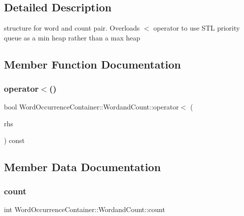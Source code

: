 \subsection{Detailed Description}
structure for word and count pair. Overloads $<$ operator to use S\+TL priority queue as a min heap rather than a max heap 

\subsection{Member Function Documentation}
\mbox{\label{struct_word_occurrence_container_1_1_wordand_count_a6922cc342d2df02f2786a5f1e676c7c0}} 
\subsubsection{\texorpdfstring{operator$<$()}{operator<()}}
{\footnotesize\ttfamily bool Word\+Occurrence\+Container\+::\+Wordand\+Count\+::operator$<$ (\begin{DoxyParamCaption}\item[{const \mbox{\hyperlink{struct_word_occurrence_container_1_1_wordand_count}{Wordand\+Count}} \&}]{rhs }\end{DoxyParamCaption}) const\hspace{0.3cm}{\ttfamily [inline]}}



\subsection{Member Data Documentation}
\mbox{\label{struct_word_occurrence_container_1_1_wordand_count_afdf294dfe0ee38b2d79d2def3c46b11a}} 
\subsubsection{\texorpdfstring{count}{count}}
{\footnotesize\ttfamily int Word\+Occurrence\+Container\+::\+Wordand\+Count\+::count}

